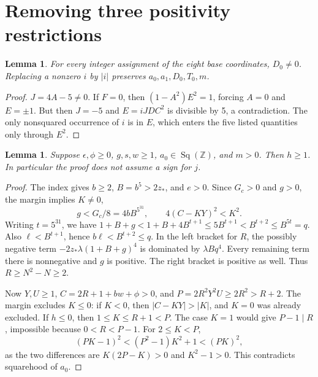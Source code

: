 \documentclass[11pt]{article}
\newtheorem{lemma}[theorem]{Lemma}
\theoremstyle{remark}\newtheorem{remark}[theorem]{Remark}
\newcommand{\Z}{\mathbb Z}\newcommand{\N}{\mathbb N}
\newcommand{\Sq}{\operatorname{Sq}(\Z)}
\begin{document}
\section{Removing three positivity restrictions}\label{sec:normalization}
\begin{lemma}\label{lem:denom}
For every integer assignment of the eight base coordinates, $D_0\ne0$.
Replacing a nonzero $i$ by $|i|$ preserves $a_0,a_1,D_0,T_0,m$.
\end{lemma}
\begin{proof}
$J=4A-5\ne0$. If $F=0$, then $(1-A^2)E^2=1$, forcing $A=0$ and
$E=\pm1$. But then $J=-5$ and $E=iJDC^2$ is divisible by 5, a
contradiction. The only nonsquared occurrence of $i$ is in $E$, which
enters the five listed quantities only through $E^2$.
\end{proof}

\begin{lemma}\label{lem:h}
Suppose $\epsilon,\phi\ge0$, $g,s,w\ge1$, $a_0\in\Sq$, and $m>0$.
Then $h\ge1$. In particular the proof does not assume a sign for $j$.
\end{lemma}
\begin{proof}
The index gives $b\ge2$, $B=b^5>2z_*$, and $e>0$.
Since $G_c>0$ and $g>0$, the margin implies $K\ne0$,
\[
 g<G_c/8=4bB^{5^{31}},\qquad 4(C-KY)^2<K^2.
\]
Writing $t=5^{31}$, we have
$1+B+g<1+B+4B^{t+1}\le5B^{t+1}<B^{t+2}\le B^{5t}=q$.
Also $\ell<B^{t+1}$, hence $b\ell<B^{t+2}\le q$.
In the left bracket for $R$, the possibly negative term
$-2z_*\lambda(1+B+g)^4$ is dominated by $\lambda Bq^4$.
Every remaining term there is nonnegative and $g$ is positive. The
right bracket is positive as well. Thus $R\ge N^2-N\ge2$.

Now $Y,U\ge1$, $C=2R+1+bw+\phi>0$, and
$P=2R^2Y^2U\ge2R^2>R+2$. The margin excludes $K\le0$:
if $K<0$, then $|C-KY|> |K|$, and $K=0$ was already excluded.
If $h\le0$, then $1\le K\le R+1<P$. The case $K=1$ would give
$P-1\mid R$, impossible because $0<R<P-1$. For $2\le K<P$,
\[
 (PK-1)^2<(P^2-1)K^2+1<(PK)^2,
\]
as the two differences are $K(2P-K)>0$ and $K^2-1>0$.
This contradicts squarehood of $a_0$.
\end{proof}
\end{document}
